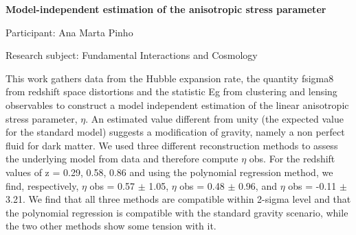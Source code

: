 \hfill 

\begin{minipage}[t]{1.0\textwidth}

\begin{center}

{{\large\bfseries Model-independent estimation of the anisotropic stress parameter}\par}

\end{center}

{\noindent Participant: Ana Marta Pinho\par} 

{\noindent Research subject: Fundamental Interactions and Cosmology\par}\medskip

\noindent This work gathers data from the Hubble expansion rate, the quantity fsigma8 from redshift space distortions and the statistic Eg from clustering and lensing observables to construct a model independent estimation of the linear anisotropic stress parameter, $\eta$. An estimated value different from unity (the expected value for the standard model) suggests a modification of gravity, namely a non perfect fluid for dark matter. We used three different reconstruction methods to assess the underlying model from data and therefore compute $\eta$ obs. For the redshift values of z = 0.29, 0.58, 0.86 and using the polynomial regression method, we find, respectively, $\eta$ obs = 0.57 $\pm$ 1.05, $\eta$ obs = 0.48 $\pm$ 0.96, and $\eta$ obs = -0.11 $\pm$ 3.21. We find that all three methods are compatible within 2-sigma level and that the polynomial regression is compatible with the standard gravity scenario, while the two other methods show some tension with it.\par\end{minipage}

\hfill 

